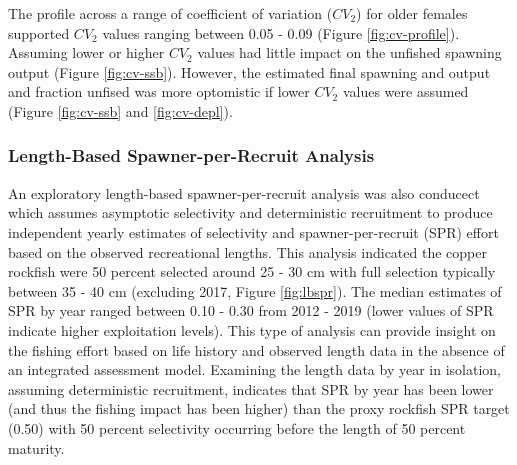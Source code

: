 \documentclass[11pt,
  english,
  a4paper,
]{article}
\begin{document}

The profile across a range of coefficient of variation ({\(CV_2\)\leavevmode\tagmcend\tagstructend}) for older females supported {\(CV_2\)\leavevmode\tagmcend\tagstructend} values ranging between 0.05 - 0.09 (Figure \ref{fig:cv-profile}). Assuming lower or higher {\(CV_2\)\leavevmode\tagmcend\tagstructend} values had little impact on the unfished spawning output (Figure \ref{fig:cv-ssb}). However, the estimated final spawning and output and fraction unfised was more optomistic if lower {\(CV_2\)\leavevmode\tagmcend\tagstructend} values were assumed (Figure \ref{fig:cv-ssb} and \ref{fig:cv-depl}).

\leavevmode\tagmcend\tagstructend\par


\hypertarget{length-based-spawner-per-recruit-analysis}{%
\subsubsection{Length-Based Spawner-per-Recruit Analysis}\label{length-based-spawner-per-recruit-analysis}}

\leavevmode\tagmcend\tagstructend


An exploratory length-based spawner-per-recruit analysis was also conducect which assumes asymptotic selectivity and deterministic recruitment to produce independent yearly estimates of selectivity and spawner-per-recruit (SPR) effort based on the observed recreational lengths. This analysis indicated the copper rockfish were 50 percent selected around 25 - 30 cm with full selection typically between 35 - 40 cm (excluding 2017, Figure \ref{fig:lbspr}). The median estimates of SPR by year ranged between 0.10 - 0.30 from 2012 - 2019 (lower values of SPR indicate higher exploitation levels). This type of analysis can provide insight on the fishing effort based on life history and observed length data in the absence of an integrated assessment model. Examining the length data by year in isolation, assuming deterministic recruitment, indicates that SPR by year has been lower (and thus the fishing impact has been higher) than the proxy rockfish SPR target (0.50) with 50 percent selectivity occurring before the length of 50 percent maturity.
\end{document}
